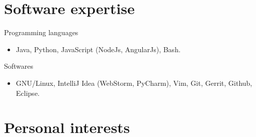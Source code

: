 \documentclass{res}
\newcommand{\inFrench}[1]{}
\newcommand{\inEnglish}[1]{#1}
\begin{document}
\begin{resume}
{	\section{Software expertise}
}
\vspace{6pt}

\inFrench{
	Langages de programmation
	\vspace{0.05in}
	\begin{itemize}
		\item Java, Python, JavaScript (NodeJs, AngularJs), Bash.
	\end{itemize}

	Logiciels maîtrisés
	\vspace{0.05in}
	\begin{itemize}
		\item GNU/Linux, IntelliJ Idea (WebStorm, PyCharm), Vim, Git, Gerrit, Github, Éclipse.
	\end{itemize}
}

\inEnglish{
	Programming languages
	\vspace{0.05in}
	\begin{itemize}
		\item Java, Python, JavaScript (NodeJs, AngularJs), Bash.
	\end{itemize}

	Softwares
	\vspace{0.05in}
	\begin{itemize}
		\item GNU/Linux, IntelliJ Idea (WebStorm, PyCharm), Vim, Git, Gerrit, Github, Eclipse.
	\end{itemize}
}


\inFrench{
	\section{Intérêts personnels}
}
\inEnglish{
	\section{Personal interests}
}
\vspace{6pt}

\inFrench{
	\vspace{6pt}
	\begin{itemize} \itemsep -2pt
		\item Logiciels libres et open source;
		\item Développement Linux Kernel et projet Debian;
		\item Nouvelles informatiques et avancées technologiques;
		\item Utilisation des technologies dans un contexte social;
		\item Conception de jeux vidéos et ludification (gamification).
	\end{itemize}
}


\end{resume}
\end{document}
